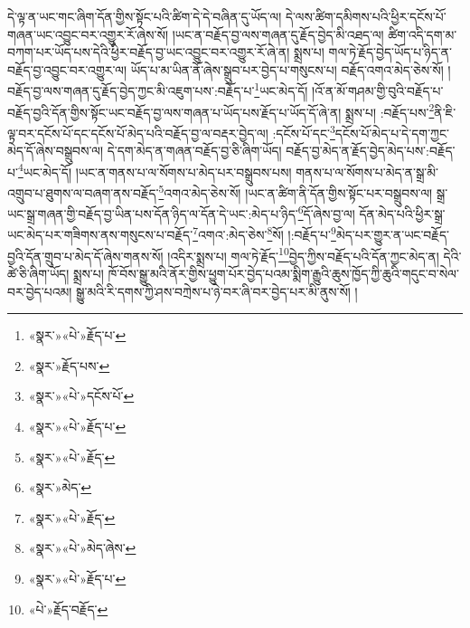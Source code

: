 དེ་ལྟ་ན་ཡང་གང་ཞིག་དོན་གྱིས་སྟོང་པའི་ཚིག་དེ་དེ་བཞིན་དུ་ཡོད་ལ། དེ་ལས་ཚིག་དམིགས་པའི་ཕྱིར་དངོས་པོ་གཞན་ཡང་འབྱུང་བར་འགྱུར་རོ་ཞེས་སོ། །ཡང་ན་བརྗོད་བྱ་ལས་གཞན་དུ་རྗོད་བྱེད་མི་འཐད་ལ། ཚིག་འདི་དག་མ་བཀག་པར་ཡོད་པས་དེའི་ཕྱིར་བརྗོད་བྱ་ཡང་འབྱུང་བར་འགྱུར་རོ་ཞེ་ན། སྨྲས་པ། གལ་ཏེ་རྗོད་བྱེད་ཡོད་པ་ཉིད་ན་བརྗོད་བྱ་འབྱུང་བར་འགྱུར་ལ། ཡོད་པ་མ་ཡིན་ནོ་ཞེས་སྒྲུབ་པར་བྱེད་པ་གསུངས་པ། བརྗོད་འགའ་མེད་ཅེས་སོ། །བརྗོད་བྱ་ལས་གཞན་དུ་རྗོད་བྱེད་ཀྱང་མི་འཇུག་པས་:བརྗོད་པ་\footnote{«སྣར་»«པེ་»རྗོད་པ་}ཡང་མེད་དོ། །འོ་ན་མོ་གཤམ་གྱི་བུའི་བརྗོད་པ་བརྗོད་བྱའི་དོན་གྱིས་སྟོང་ཡང་བརྗོད་བྱ་ལས་གཞན་པ་ཡོད་པས་རྗོད་པ་ཡོད་དོ་ཞེ་ན། སྨྲས་པ། :བརྗོད་པས་\footnote{«སྣར་»རྗོད་པས་}ནི་ཇི་ལྟ་བར་དངོས་པོ་དང་དངོས་པོ་མེད་པའི་བརྗོད་བྱ་ལ་བརྡར་བྱེད་ལ། :དངོས་པོ་དང་\footnote{«སྣར་»«པེ་»དངོས་པོ་}དངོས་པོ་མེད་པ་དེ་དག་ཀྱང་མེད་དོ་ཞེས་བསྒྲུབས་ལ། དེ་དག་མེད་ན་གཞན་བརྗོད་བྱ་ཅི་ཞིག་ཡོད། བརྗོད་བྱ་མེད་ན་རྗོད་བྱེད་མེད་པས་:བརྗོད་པ་\footnote{«སྣར་»«པེ་»རྗོད་པ་}ཡང་མེད་དོ། །ཡང་ན་གནས་པ་ལ་སོགས་པ་མེད་པར་བསྒྲུབས་པས། གནས་པ་ལ་སོགས་པ་མེད་ན་སྒྲ་མི་འགྲུབ་པ་ཐུགས་ལ་བཞག་ནས་བརྗོད་\footnote{«སྣར་»«པེ་»རྗོད་}འགའ་མེད་ཅེས་སོ། །ཡང་ན་ཚིག་ནི་དོན་གྱིས་སྟོང་པར་བསྒྲུབས་ལ། སྒྲ་ཡང་སྒྲ་གཞན་གྱི་བརྗོད་བྱ་ཡིན་པས་དོན་ཉིད་ལ་དོན་དེ་ཡང་:མེད་པ་ཉིད་\footnote{«སྣར་»མེད་}དོ་ཞེས་བྱ་ལ། དོན་མེད་པའི་ཕྱིར་སྒྲ་ཡང་མེད་པར་གཟིགས་ནས་གསུངས་པ་བརྗོད་\footnote{«སྣར་»«པེ་»རྗོད་}འགའ་:མེད་ཅེས་\footnote{«སྣར་»«པེ་»མེད་ཞེས་}སོ། །:བརྗོད་པ་\footnote{«སྣར་»«པེ་»རྗོད་པ་}མེད་པར་གྱུར་ན་ཡང་བརྗོད་བྱའི་དོན་གྲུབ་པ་མེད་དོ་ཞེས་གནས་སོ། །འདིར་སྨྲས་པ། གལ་ཏེ་རྗོད་\footnote{«པེ་»རྗོད་བརྗོད་}བྱེད་ཀྱིས་བརྗོད་པའི་དོན་ཀྱང་མེད་ན། དེའི་ཚེ་ཅི་ཞིག་ཡོད། སྨྲས་པ། ཁོ་བོས་སྒྱུ་མའི་ནོར་གྱིས་ཕྱུག་པོར་བྱེད་པའམ་སྨིག་རྒྱུའི་ཆུས་ཁྱོད་ཀྱི་ཆུའི་གདུང་བ་སེལ་བར་བྱེད་པའམ། སྒྱུ་མའི་རི་དགས་ཀྱི་ཤས་བཀྲེས་པ་ཉེ་བར་ཞི་བར་བྱེད་པར་མི་ནུས་སོ། །
